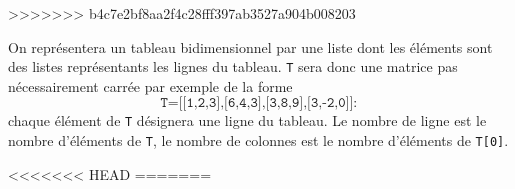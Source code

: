 >>>>>>> b4c7e2bf8aa2f4c28fff397ab3527a904b008203

On représentera un tableau bidimensionnel par une liste dont les éléments sont des listes représentants les lignes du tableau. \texttt{T} sera donc une matrice pas nécessairement carrée par exemple de la forme $$\texttt{T=[[1,2,3],[6,4,3],[3,8,9],[3,-2,0]]}:$$ chaque élément de \texttt{T} désignera une ligne du tableau. Le nombre de ligne est le nombre d'éléments de \texttt{T}, le nombre de colonnes est le nombre d'éléments de \texttt{T[0]}.

<<<<<<< HEAD
=======



